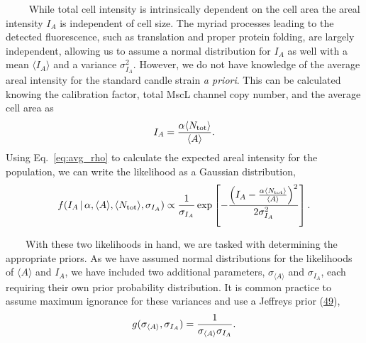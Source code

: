 ~~~~
While
total
cell
intensity
is
intrinsically
dependent
on the
cell
area
the
areal
intensity
\(I_A\)
is
independent
of
cell
size.
The
myriad
processes
leading
to the
detected
fluorescence,
such
as
translation
and
proper
protein
folding,
are
largely
independent,
allowing
us to
assume
a
normal
distribution
for
\(I_A\)
as
well
with a
mean
\(\langle I_A \rangle\)
and a
variance
\(\sigma_{I_A}^2\).
However,
we do
not
have
knowledge
of the
average
areal
intensity
for
the
standard
candle
strain
\emph{a
priori}.
This
can be
calculated
knowing
the
calibration
factor,
total
MscL
channel
copy
number,
and
the
average
cell
area
as
\begin{equation}
I_A =  {\alpha\langle N_\text{tot} \rangle \over \langle A \rangle}.
\label{eq:avg_rho}\end{equation}
Using
Eq.~\ref{eq:avg_rho}
to
calculate
the
expected
areal
intensity
for
the
population,
we can
write
the
likelihood
as a
Gaussian
distribution,
\begin{equation}
f(I_A\,\vert\,\alpha,\langle A \rangle,\langle N_\text{tot} \rangle, \sigma_{I_A}) \propto {1 \over \sigma_{I_A}}\exp\left[-{\left(I_A - {\alpha \langle N_\text{tot} \rangle\over \langle A \rangle}\right)^2 \over 2 \sigma_{I_A}^2}\right].
\label{eq:rho_likelihood}\end{equation}

~~~~With
these
two
likelihoods
in
hand,
we are
tasked
with
determining
the
appropriate
priors.
As we
have
assumed
normal
distributions
for
the
likelihoods
of
\(\langle A \rangle\)
and
\(I_A\),
we
have
included
two
additional
parameters,
\(\sigma_{\langle A \rangle}\)
and
\(\sigma_{I_A}\),
each
requiring
their
own
prior
probability
distribution.
It is
common
practice
to
assume
maximum
ignorance
for
these
variances
and
use a
Jeffreys
prior
(\protect\hyperlink{ref-sivia2006}{49}),
\begin{equation}
g(\sigma_{\langle A \rangle}, \sigma_{I_A}) = {1 \over \sigma_{\langle A \rangle}\sigma_{I_A}}.
\label{eq:jeffreys}\end{equation}

